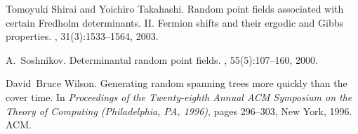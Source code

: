 \documentclass[11pt]{article}
\providecommand{\1}{\mathBB{1}}
\begin{document}
\begin{thebibliography}{10}
Tomoyuki Shirai and Yoichiro Takahashi.
\newblock Random point fields associated with certain {F}redholm determinants.
  {II}. {F}ermion shifts and their ergodic and {G}ibbs properties.
, 31(3):1533--1564, 2003.

A.~Soshnikov.
\newblock Determinantal random point fields.
, 55(5):107--160, 2000.

David~Bruce Wilson.
\newblock Generating random spanning trees more quickly than the cover time.
\newblock In {\em Proceedings of the {T}wenty-eighth {A}nnual {ACM} {S}ymposium
  on the {T}heory of {C}omputing ({P}hiladelphia, {PA}, 1996)}, pages 296--303,
  New York, 1996. ACM.

\end{thebibliography}
\end{document}
